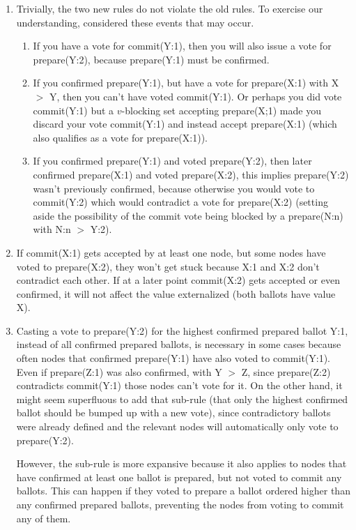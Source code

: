 \begin{enumerate}
    \item Trivially, the two new rules do not violate the old rules. To exercise our understanding, considered these events that may occur.
    \begin{enumerate}
        \item If you have a vote for commit(Y:1), then you will also issue a vote for prepare(Y:2), because prepare(Y:1) must be confirmed.

        \item If you confirmed prepare(Y:1), but have a vote for prepare(X:1) with X $>$ Y, then you can't have voted commit(Y:1). Or perhaps you did vote commit(Y:1) but a $v$-blocking set accepting prepare(X;1) made you discard your vote commit(Y:1) and instead accept prepare(X:1) (which also qualifies as a vote for prepare(X:1)).

        \item If you confirmed prepare(Y:1) and voted prepare(Y:2), then later confirmed prepare(X:1) and voted prepare(X:2), this implies prepare(Y:2) wasn't previously confirmed, because otherwise you would vote to commit(Y:2) which would contradict a vote for prepare(X:2) (setting aside the possibility of the commit vote being blocked by a prepare(N:n) with N:n $>$ Y:2).
    \end{enumerate}

    \item If commit(X:1) gets accepted by at least one node, but some nodes have voted to prepare(X:2), they won't get stuck because X:1 and X:2 don't contradict each other. If at a later point commit(X:2) gets accepted or even confirmed, it will not affect the value externalized (both ballots have value X).

    \item Casting a vote to prepare(Y:2) for the highest confirmed prepared ballot Y:1, instead of all confirmed prepared ballots, is necessary in some cases because often nodes that confirmed prepare(Y:1) have also voted to commit(Y:1). Even if prepare(Z:1) was also confirmed, with Y $>$ Z, since prepare(Z:2) contradicts commit(Y:1) those nodes can't vote for it. On the other hand, it might seem superfluous to add that sub-rule (that only the highest confirmed ballot should be bumped up with a new vote), since contradictory ballots were already defined and the relevant nodes will automatically only vote to prepare(Y:2).

    However, the sub-rule is more expansive because it also applies to nodes that have confirmed at least one ballot is prepared, but not voted to commit any ballots. This can happen if they voted to prepare a ballot ordered higher than any confirmed prepared ballots, preventing the nodes from voting to commit any of them.


\end{enumerate}
